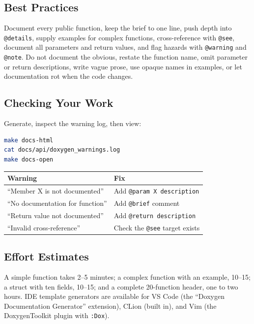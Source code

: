 \subsection{Best Practices}

Document every public function, keep the brief to one line, push depth into
\texttt{@details}, supply examples for complex functions, cross-reference with
\texttt{@see}, document all parameters and return values, and flag hazards with
\texttt{@warning} and \texttt{@note}. Do not document the obvious, restate the
function name, omit parameter or return descriptions, write vague prose, use
opaque names in examples, or let documentation rot when the code changes.

\subsection{Checking Your Work}

Generate, inspect the warning log, then view:

\begin{lstlisting}[language=bash]
make docs-html
cat docs/api/doxygen_warnings.log
make docs-open
\end{lstlisting}

\begin{tabular}{ll}
\toprule
Warning & Fix \\
\midrule
``Member X is not documented'' & Add \texttt{@param X description} \\
``No documentation for function'' & Add \texttt{@brief} comment \\
``Return value not documented'' & Add \texttt{@return description} \\
``Invalid cross-reference'' & Check the \texttt{@see} target exists \\
\bottomrule
\end{tabular}

\subsection{Effort Estimates}

A simple function takes 2--5 minutes; a complex function with an example,
10--15; a struct with ten fields, 10--15; and a complete 20-function header,
one to two hours. IDE template generators are available for VS Code (the
``Doxygen Documentation Generator'' extension), CLion (built in), and Vim (the
DoxygenToolkit plugin with \texttt{:Dox}).
